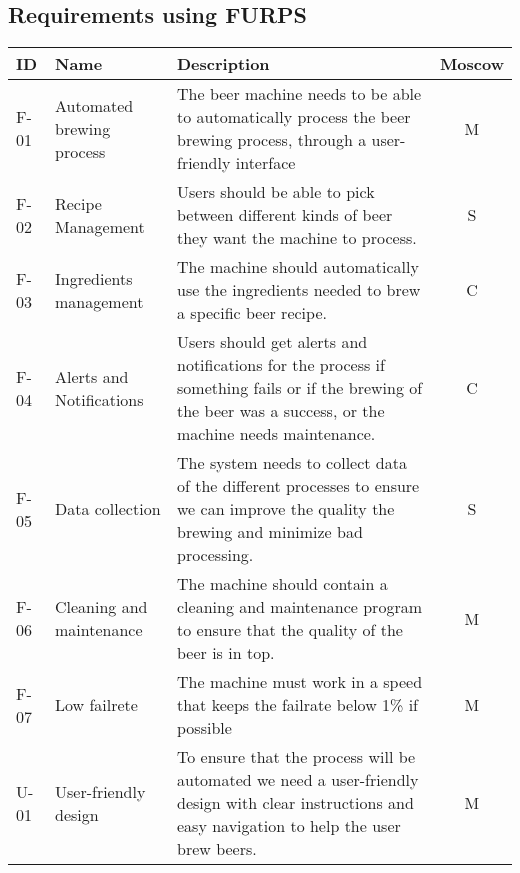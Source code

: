 \subsection{Requirements using FURPS}
\begin{center}
    \sloppy
    \begin{longtable}{|p{1cm}|p{4cm}|p{8.5cm}|c|}
        \hline
        ID     & Name                       & Description                                                                                                                                                   & Moscow \\ \hline
        F-01   & Automated brewing process  & The beer machine needs to be able to automatically process the beer brewing process, through a user-friendly interface                                        & M \\ \hline
        F-02   & Recipe Management          & Users should be able to pick between different kinds of beer they want the machine to process.                                                                & S \\ \hline
        F-03   & Ingredients management     & The machine should automatically use the ingredients needed to brew a specific beer recipe.                                                                   & C \\ \hline
        F-04   & Alerts and Notifications   & Users should get alerts and notifications for the process if something fails or if the brewing of the beer was a success, or the machine needs maintenance.   & C \\ \hline
        F-05   & Data collection            & The system needs to collect data of the different processes to ensure we can improve the quality the brewing and minimize bad processing.                     & S \\ \hline
        F-06   & Cleaning and maintenance   & The machine should contain a cleaning and maintenance program to ensure that the quality of the beer is in top.                                               & M \\ \hline
        F-07   & Low failrete               & The machine must work in a speed that keeps the failrate below 1\% if possible                                                                                & M \\ \hline
        U-01   & User-friendly design       & To ensure that the process will be automated we need a user-friendly design with clear instructions and easy navigation to help the user brew beers.          & M \\ \hline

\end{longtable}
\end{center}
